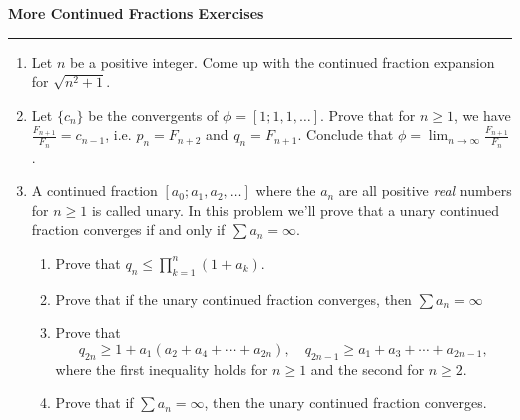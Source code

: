 \documentclass[12pt]{article}
\begin{document}
\begin{center}
{\bf \Large More Continued Fractions Exercises}
\vspace{0.2cm}
\hrule
\end{center}

\begin{enumerate}
	\item Let $n$ be a positive integer. Come up with the continued fraction expansion for $\sqrt{n^2+1}$.
	\vfill
	\item Let $\{c_n\}$ be the convergents of $\phi = [1; 1, 1, \ldots]$. Prove that for $n\geq 1$, we have $\frac{F_{n+1}}{F_n} = c_{n-1}$, i.e. $p_n = F_{n+2}$ and $q_n = F_{n+1}$. Conclude that $\phi = \lim_{n\to \infty}\frac{F_{n+1}}{F_n}$.
	\vfill
	\item A continued fraction $[a_0; a_1, a_2, \ldots]$ where the $a_n$ are all positive \textit{real} numbers for $n\geq 1$ is called unary. In this problem we'll prove that a unary continued fraction converges if and only if $\sum a_n = \infty$.
	\begin{enumerate}
		\item Prove that $q_n \leq \prod_{k=1}^n(1+a_k)$.
		\vfill
		\item Prove that if the unary continued fraction converges, then $\sum a_n = \infty$
		\vfill
		\item Prove that
		\[
		q_{2n}\geq 1+a_1(a_2+a_4 + \cdots + a_{2n}),\quad q_{2n-1} \geq a_1 + a_3 + \cdots + a_{2n-1},
		\]
		where the first inequality holds for $n\geq 1$ and the second for $n\geq 2$.
		\vfill
		\item Prove that if $\sum a_n =  \infty$, then the unary continued fraction converges.
	\end{enumerate}
	\vfill
\end{enumerate}
\end{document}
